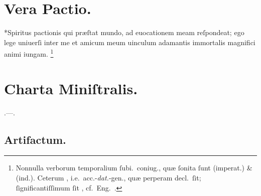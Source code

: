 \documentclass[12pt]{book}
\newcommand{\reconst}{*}
\begin{document}
\section{Vera Pactio.}\label{vera-pactio}
\reconst{}Spiritus pactionis qui præſtat mundo,
ad euocationem meam reſpondeat;
ego lege uniuerſi inter me et amicum meum
uinculum adamantis immortalis magnifici animi iungam.
%
\footnote{%
  Nonnulla verborum temporalium ſubi.\ coniug.,
  quæ ſonita ſunt  (imperat.) \&  (ind.).
  Ceterum , i.e.\ acc.-\emph{dat.}-gen.,
  quæ perperam decl.\ ſit;
  ſignificantiſſimum ſit
  ,
  cf.~Eng.\ .
}


\section{Charta Miniſtralis.}\label{charta-ministralis}
.---.

\subsection{Artifactum.}\label{artifactum}
\end{document}
